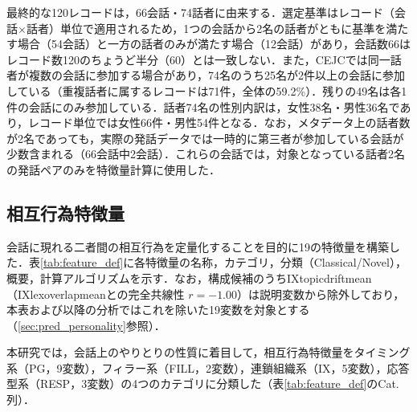 \documentclass[dvipdfmx,11pt,a4paper]{bxjsarticle}
\renewcommand{\_}{\paperorigunderscore\allowbreak}%
\begin{document}

最終的な120レコードは，66会話・74話者に由来する．選定基準はレコード（会話$\times$話者）単位で適用されるため，1つの会話から2名の話者がともに基準を満たす場合（54会話）と一方の話者のみが満たす場合（12会話）があり，会話数66はレコード数120のちょうど半分（60）とは一致しない．また，CEJCでは同一話者が複数の会話に参加する場合があり，74名のうち25名が2件以上の会話に参加している（重複話者に属するレコードは71件，全体の59.2\%）．残りの49名は各1件の会話にのみ参加している．話者74名の性別内訳は，女性38名・男性36名であり，レコード単位では女性66件・男性54件となる．なお，メタデータ上の話者数が2名であっても，実際の発話データでは一時的に第三者が参加している会話が少数含まれる（66会話中2会話）．これらの会話では，対象となっている話者2名の発話ペアのみを特徴量計算に使用した．




\subsection{相互行為特徴量}
\label{sec:features}


会話に現れる二者間の相互行為を定量化することを目的に19の特徴量を構築した．表\ref{tab:feature_def}に各特徴量の名称，カテゴリ，分類（Classical/Novel），概要，計算アルゴリズムを示す．なお，構成候補のうちIX\_topic\_drift\_mean（IX\_lex\_overlap\_meanとの完全共線性 $r=-1.00$）は説明変数から除外しており，本表および以降の分析ではこれを除いた19変数を対象とする（\ref{sec:pred_personality}参照）．



本研究では，会話上のやりとりの性質に着目して，相互行為特徴量をタイミング系（PG，9変数），フィラー系（FILL，2変数），連鎖組織系（IX，5変数），応答型系（RESP，3変数）の4つのカテゴリに分類した（表\ref{tab:feature_def}のCat.列）．
\end{document}
